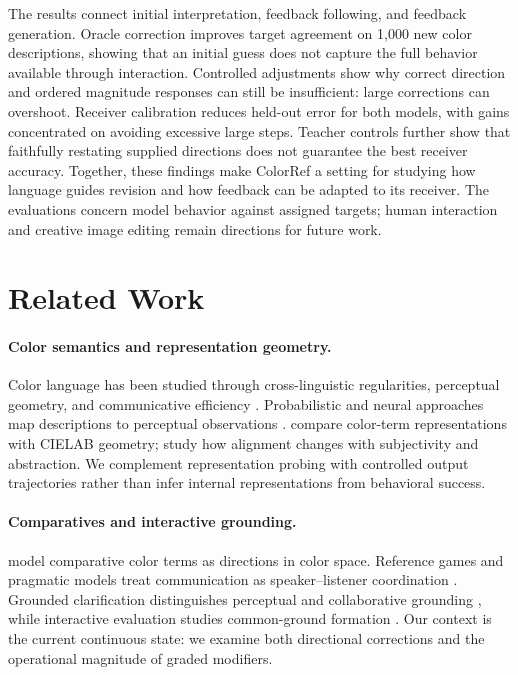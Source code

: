 \documentclass[11pt]{article}
\begin{document}
The results connect initial interpretation, feedback following, and feedback
generation. Oracle correction improves target agreement on 1{,}000 new color
descriptions, showing that an initial guess does not capture the full
behavior available through interaction. Controlled adjustments show why
correct direction and ordered magnitude responses can still be insufficient:
large corrections can overshoot. Receiver calibration reduces held-out error
for both models, with gains concentrated on avoiding excessive large steps.
Teacher controls further show that faithfully restating supplied directions
does not guarantee the best receiver accuracy. Together, these findings
make ColorRef a setting for studying how language guides revision and how
feedback can be adapted to its receiver. The evaluations concern model
behavior against assigned targets; human interaction and creative image
editing remain directions for future work.

\section{Related Work}
\label{sec:related_work}

\paragraph{Color semantics and representation geometry.}
Color language has been studied through cross-linguistic regularities,
perceptual geometry, and communicative efficiency
\citep{berlin1991basic,regier2007color,zaslavsky2018efficient}.
Probabilistic and neural approaches map descriptions to perceptual
observations \citep{mcmahan2015bayesian,monroe2017colors}.
\citet{abdou-etal-2021-language} compare color-term representations with
CIELAB geometry; \citet{loyola-etal-2023-perceptual} study how alignment
changes with subjectivity and abstraction. We complement representation
probing with controlled output trajectories rather than infer internal
representations from behavioral success.

\paragraph{Comparatives and interactive grounding.}
\citet{winn-muresan-2018-lighter} model comparative color terms as directions
in color space. Reference games and pragmatic models treat communication as
speaker--listener coordination
\citep{lewis1969convention,frank2012predicting,goodman2016pragmatic}.
Grounded clarification distinguishes perceptual and collaborative grounding
\citep{benotti2021recipe}, while interactive evaluation studies common-ground
formation \citep{imai2025measuring}. Our context is the current continuous
state: we examine both directional corrections and the operational magnitude
of graded modifiers.
\end{document}
